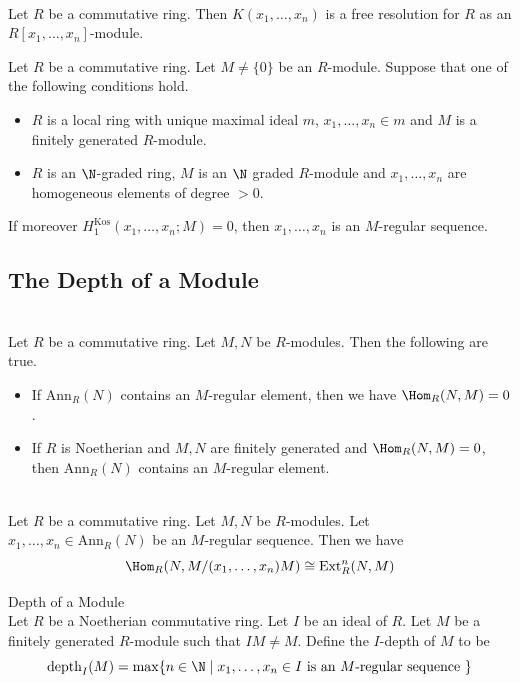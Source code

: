 \documentclass[a4paper]{article}
\begin{document}
\begin{eg}{}{}\\
Let $R$ be a commutative ring. Then $K(x_1,\dots,x_n)$ is a free resolution for $R$ as an $R[x_1,\dots,x_n]$-module. 
\end{eg}

\begin{prp}{}{} Let $R$ be a commutative ring. Let $M\neq\{0\}$ be an $R$-module. Suppose that one of the following conditions hold. 
\begin{itemize}
\item $R$ is a local ring with unique maximal ideal $m$, $x_1,\dots,x_n\in m$ and $M$ is a finitely generated $R$-module. 
\item $R$ is an $\N$-graded ring, $M$ is an $\N$ graded $R$-module and $x_1,\dots,x_n$ are homogeneous elements of degree $>0$. 
\end{itemize}
If moreover $H_1^\text{Kos}(x_1,\dots,x_n;M)=0$, then $x_1,\dots,x_n$ is an $M$-regular sequence. 
\end{prp}

\subsection{The Depth of a Module}
\begin{prp}{}{}\\
Let $R$ be a commutative ring. Let $M,N$ be $R$-modules. Then the following are true. 
\begin{itemize}
\item If $\text{Ann}_R(N)$ contains an $M$-regular element, then we have $\Hom_R(N,M)=0$. 
\item If $R$ is Noetherian and $M,N$ are finitely generated and $\Hom_R(N,M)=0$, then $\text{Ann}_R(N)$ contains an $M$-regular element. 
\end{itemize}
\end{prp}

\begin{prp}{}{}\\
Let $R$ be a commutative ring. Let $M,N$ be $R$-modules. Let $x_1,\dots,x_n\in\text{Ann}_R(N)$ be an $M$-regular sequence. Then we have $$\Hom_R(N,M/(x_1,\dots,x_n)M)\cong\text{Ext}_R^n(N,M)$$
\end{prp}

\begin{defn}{Depth of a Module}{}\\
Let $R$ be a Noetherian commutative ring. Let $I$ be an ideal of $R$. Let $M$ be a finitely generated $R$-module such that $IM\neq M$. Define the $I$-depth of $M$ to be $$\text{depth}_I(M)=\max\{n\in\N\;|\;x_1,\dots,x_n\in I\text{ is an }M\text{-regular sequence }\}$$
\end{defn}
\end{document}
